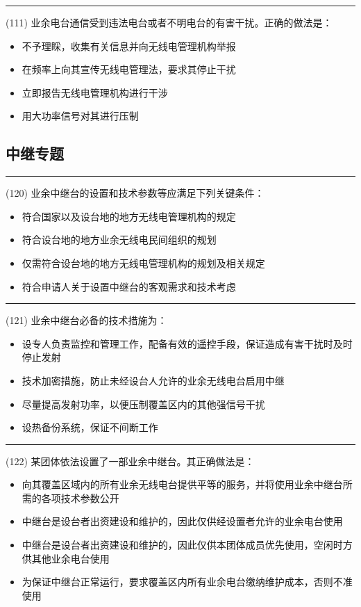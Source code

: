 \documentclass[twocolumn,hyperref,UTF8]{ctexart}  %
\begin{document}
\noindent\rule{0.5\textwidth}{1pt}
\heiti (111) 业余电台通信受到违法电台或者不明电台的有害干扰。正确的做法是： \songti {\color{gray} [LK0247] }
\begin{itemize}
	\item  不予理睬，收集有关信息并向无线电管理机构举报
	\item  在频率上向其宣传无线电管理法，要求其停止干扰
	\item  立即报告无线电管理机构进行干涉
	\item  用大功率信号对其进行压制
\end{itemize}


\clearpage
\subsection{中继专题}


\noindent\rule{0.5\textwidth}{1pt}
\heiti (120) 业余中继台的设置和技术参数等应满足下列关键条件： \songti {\color{gray} [LK0034] }
\begin{itemize}
	\item  符合{\color{LimeGreen}国家以及设台地}的地方无线电{\color{LimeGreen}管理机构}的规定
	\item  符合{\color{red}设台地}的地方业余无线电{\color{red}民间组织}的规划
	\item  仅需符合{\color{red}设台地}的地方无线电{\color{LimeGreen}管理机构}的规划及相关规定
	\item  符合申请人关于设置中继台的客观需求和技术考虑
\end{itemize}


\noindent\rule{0.5\textwidth}{1pt}
\heiti (121) 业余中继台必备的技术措施为： \songti {\color{gray} [LK0035] }
\begin{itemize}
	\item  设专人负责监控和管理工作，配备有效的遥控手段，保证造成有害干扰时及时停止发射
	\item  技术加密措施，防止未经设台人允许的业余无线电台启用中继
	\item  尽量提高发射功率，以便压制覆盖区内的其他强信号干扰
	\item  设热备份系统，保证不间断工作
\end{itemize}


\noindent\rule{0.5\textwidth}{1pt}
\heiti (122) 某团体依法设置了一部业余中继台。其正确做法是： \songti {\color{gray} [LK0036] }
\begin{itemize}
	\item  向其覆盖区域内的所有业余无线电台提供平等的服务，并将使用业余中继台所需的各项技术参数公开
	\item  中继台是设台者出资建设和维护的，因此仅供经设置者允许的业余电台使用
	\item  中继台是设台者出资建设和维护的，因此仅供本团体成员优先使用，空闲时方供其他业余电台使用
	\item  为保证中继台正常运行，要求覆盖区内所有业余电台缴纳维护成本，否则不准使用
\end{itemize}
\end{document}
